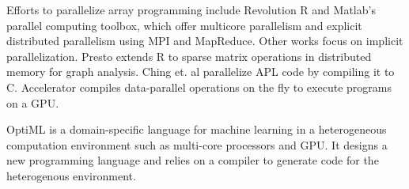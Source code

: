 Efforts to parallelize array programming include Revolution R \cite{rro} and
Matlab's parallel computing toolbox, which offer multicore parallelism and
explicit distributed parallelism using MPI and MapReduce. Other works focus
on implicit parallelization. Presto \cite{presto} extends R to sparse matrix
operations in distributed memory for graph
analysis. Ching et. al \cite{Ching12} parallelize APL code by
compiling it to C. Accelerator \cite{accelerator} compiles
data-parallel operations on the fly to execute programs on a GPU.

OptiML \cite{optiml} is a domain-specific language for machine
learning in a heterogeneous computation environment such as multi-core
processors and GPU. It designs a new programming language and relies on
a compiler to generate code for the heterogenous environment.
